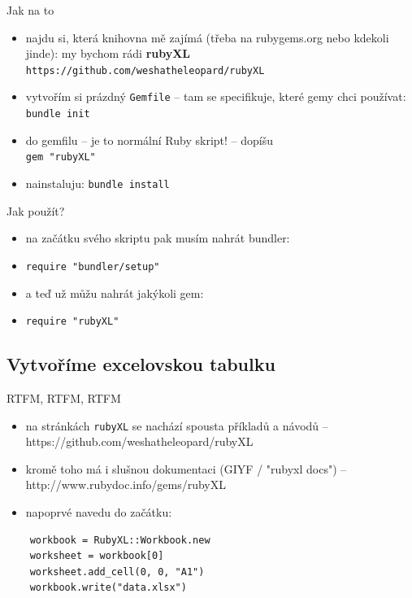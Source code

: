 \documentclass{beamer}
\begin{document}
\begin{frame}{Jak na to}
  \begin{itemize}
    \item najdu si, která knihovna mě zajímá (třeba na rubygems.org nebo kdekoli jinde): my bychom rádi \textbf{rubyXL} \texttt{https://github.com/weshatheleopard/rubyXL}
    \item vytvořím si prázdný \texttt{Gemfile} -- tam se specifikuje, které gemy chci používat: \texttt{bundle init}
    \item do gemfilu -- je to normální Ruby skript! -- dopíšu\\ \texttt{gem "rubyXL"}
    \item nainstaluju: \texttt{bundle install}
  \end{itemize}
\end{frame}

\begin{frame}{Jak použít?}
  \begin{itemize}
    \item na začátku svého skriptu pak musím nahrát bundler:
    \item \texttt{require "bundler/setup"}
    \item a teď už můžu nahrát jakýkoli gem:
    \item \texttt{require "rubyXL"}
  \end{itemize}
\end{frame}

\subsection{Vytvoříme excelovskou tabulku}

\begin{frame}[fragile]{RTFM, RTFM, RTFM}
  \begin{itemize}
    \item na stránkách \texttt{rubyXL} se nachází spousta příkladů a návodů -- https://github.com/weshatheleopard/rubyXL
    \item kromě toho má i slušnou dokumentaci (GIYF / "rubyxl docs") -- http://www.rubydoc.info/gems/rubyXL
    \item napoprvé navedu do začátku:
  \end{itemize}
  {\scriptsize
  \begin{verbatim}
    workbook = RubyXL::Workbook.new
    worksheet = workbook[0]
    worksheet.add_cell(0, 0, "A1")
    workbook.write("data.xlsx")
  \end{verbatim}
  }
\end{frame}
\end{document}

